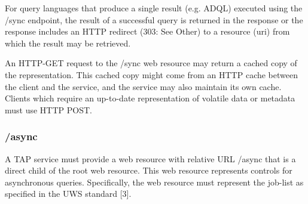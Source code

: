 \documentclass[11pt,a4paper]{ivoa}
\begin{document}
For query languages that produce a single result (e.g. ADQL) executed using the 
/sync endpoint, the result of a successful query is returned in the response or 
the response includes an HTTP redirect (303: See Other) to a resource (uri) from 
which the result may be retrieved.

An HTTP-GET request to the /sync web resource may return a cached copy of the 
representation. This cached copy might come from an HTTP cache between the 
client and the service, and the service may also maintain its own cache. Clients 
which require an up-to-date representation of volatile data or metadata must use 
HTTP POST.

\subsubsection{/async}
A TAP service must provide a web resource with relative URL /async that is a 
direct child of the root web resource. This web resource represents controls for 
asynchronous queries. Specifically, the web resource must represent the job-list 
as specified in the UWS standard [3].
\end{document}
